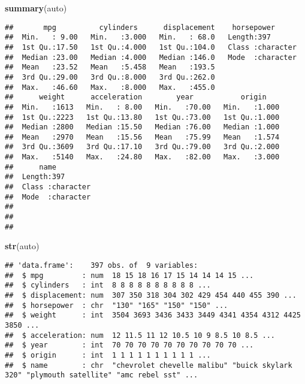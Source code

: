 \documentclass[
]{article}
\newenvironment{Shaded}{\begin{snugshade}}{\end{snugshade}}
\newcommand{\FunctionTok}[1]{\textcolor[rgb]{0.13,0.29,0.53}{\textbf{#1}}}
\newcommand{\NormalTok}[1]{#1}
\begin{document}
\begin{Shaded}
\begin{Highlighting}[]
\FunctionTok{summary}\NormalTok{(auto)}
\end{Highlighting}
\end{Shaded}

\begin{verbatim}
##       mpg          cylinders      displacement    horsepower       
##  Min.   : 9.00   Min.   :3.000   Min.   : 68.0   Length:397        
##  1st Qu.:17.50   1st Qu.:4.000   1st Qu.:104.0   Class :character  
##  Median :23.00   Median :4.000   Median :146.0   Mode  :character  
##  Mean   :23.52   Mean   :5.458   Mean   :193.5                     
##  3rd Qu.:29.00   3rd Qu.:8.000   3rd Qu.:262.0                     
##  Max.   :46.60   Max.   :8.000   Max.   :455.0                     
##      weight      acceleration        year           origin     
##  Min.   :1613   Min.   : 8.00   Min.   :70.00   Min.   :1.000  
##  1st Qu.:2223   1st Qu.:13.80   1st Qu.:73.00   1st Qu.:1.000  
##  Median :2800   Median :15.50   Median :76.00   Median :1.000  
##  Mean   :2970   Mean   :15.56   Mean   :75.99   Mean   :1.574  
##  3rd Qu.:3609   3rd Qu.:17.10   3rd Qu.:79.00   3rd Qu.:2.000  
##  Max.   :5140   Max.   :24.80   Max.   :82.00   Max.   :3.000  
##      name          
##  Length:397        
##  Class :character  
##  Mode  :character  
##                    
##                    
## 
\end{verbatim}

\begin{Shaded}
\begin{Highlighting}[]
\FunctionTok{str}\NormalTok{(auto)}
\end{Highlighting}
\end{Shaded}

\begin{verbatim}
## 'data.frame':    397 obs. of  9 variables:
##  $ mpg         : num  18 15 18 16 17 15 14 14 14 15 ...
##  $ cylinders   : int  8 8 8 8 8 8 8 8 8 8 ...
##  $ displacement: num  307 350 318 304 302 429 454 440 455 390 ...
##  $ horsepower  : chr  "130" "165" "150" "150" ...
##  $ weight      : int  3504 3693 3436 3433 3449 4341 4354 4312 4425 3850 ...
##  $ acceleration: num  12 11.5 11 12 10.5 10 9 8.5 10 8.5 ...
##  $ year        : int  70 70 70 70 70 70 70 70 70 70 ...
##  $ origin      : int  1 1 1 1 1 1 1 1 1 1 ...
##  $ name        : chr  "chevrolet chevelle malibu" "buick skylark 320" "plymouth satellite" "amc rebel sst" ...
\end{verbatim}
\end{document}
